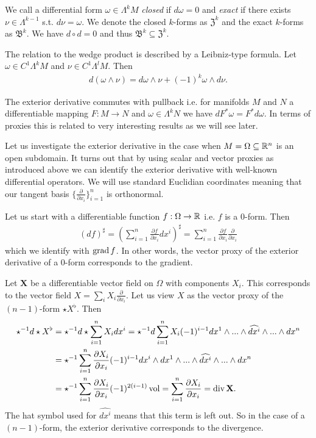 \documentclass[../master_thesis.tex]{subfiles}
\begin{document}
We call a differential form $\omega \in \Lambda^k M$ 
\textit{closed} if $d\omega = 0$ and \textit{exact}
if there exists $\nu \in \Lambda^{k-1}$ s.t. $d\nu = \omega$.
We denote the closed $k$-forms as $\mathfrak{Z}^k$ and the exact 
$k$-forms as $\mathfrak{B}^k$. We have $d\circ d = 0$ and thus 
$\mathfrak{B}^k \subseteq \mathfrak{Z}^k$.

The relation to the wedge product is described by a Leibniz-type formula. 
Let $\omega \in C^1 \Lambda^k M$ and $\nu \in C^1 \Lambda^l M$. Then
\begin{align}
    d (\omega \wedge \nu) = d\omega \wedge \nu + (-1)^k \omega \wedge d\nu.
    \label{eq:leibniz_formula}
\end{align}

The exterior derivative commutes with pullback i.e. 
for manifolds $M$ and $N$ a differentiable mapping $F:M \rightarrow N$ 
and $\omega \in \Lambda^k N$ we have $dF^* \omega = F^* d\omega$. 
In terms of proxies this is related to very interesting results as we will 
see later. 


Let us investigate the exterior derivative in the case when 
$M = \Omega \subseteq \mathbb{R}^n$ is an open subdomain. It turns out that by using 
scalar and vector proxies as introduced above we can identify the exterior 
derivative with well-known differential operators. We will use standard 
Euclidian coordinates meaning that our tangent basis $\{\frac{\partial}{\partial x_i}\}_{i=1}^n$
is orthonormal. 

Let us start with a differentiable function $f: \Omega \rightarrow \mathbb{R}$ i.e. 
$f$ is a $0$-form. Then
\begin{align*}
    (df)^\sharp = \left( \sum_{i=1}^n \frac{\partial f}{\partial x_i} dx^i 
        \right)^\sharp
    = \sum_{i=1}^n \frac{\partial f}{\partial x_i} \frac{\partial}{\partial x_i}
\end{align*}
which we identify with  $\operatorname{grad} f$. In other words, the vector proxy of the 
exterior derivative of a $0$-form corresponds to the gradient.

Let $\mathbf{X}$ be a differentiable vector field on $\Omega$ 
with components $X_i$. This corresponds to the vector field 
$X = \sum_i X_i \frac{\partial}{\partial x_i}$. Let us view
$X$ as the vector proxy 
of the $(n-1)$-form $\star X^\flat$. Then 
\begin{align*}
    \star^{-1} d\star X^\flat &= \star^{-1} d\star \sum_{i=1}^n X_i dx^i
    = \star^{-1} d \sum_{i=1}^n X_i (-1)^{i-1} 
        dx^1 \wedge ... \wedge \widehat{dx^i} 
        \wedge ... 
        \wedge dx^n
    \\ &= \star^{-1} \sum_{i=1}^n \frac{\partial X_i}{\partial x_i} (-1)^{i-1} 
        dx^i \wedge 
        dx^1 \wedge ... \wedge \widehat{dx^i} \wedge ... \wedge dx^n
    \\ &= \star^{-1} \sum_{i=1}^n \frac{\partial X_i}{\partial x_i} 
        (-1)^{2(i-1)} \operatorname{vol}
    = \sum_{i=1}^n \frac{\partial X_i}{\partial x_i}
    = \operatorname{div} \mathbf{X}.
\end{align*}
The hat symbol used for
$\widehat{dx^i}$ means that this term is left out. So in the case of a $(n-1)$-form,
the exterior derivative corresponds to the divergence.
\end{document}
